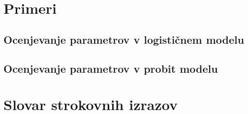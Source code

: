 \documentclass[12pt,a4paper]{amsart}
\theoremstyle{definition} %
\theoremstyle{plain} %
\newcommand{\geslo}[2]{\noindent\textbf{#1}\hspace*{3mm}\hangindent=\parindent\hangafter=1 #2}
\begin{document}
\section{Primeri}
\subsection{Ocenjevanje parametrov v logističnem modelu}
\subsection{Ocenjevanje parametrov v probit modelu}

\section*{Slovar strokovnih izrazov}

%
%





\nocite{*}


\end{document}
